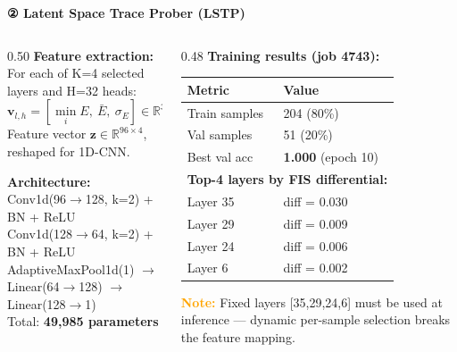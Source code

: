 \documentclass[aspectratio=169]{beamer}
\begin{document}
\begin{frame}{\textcolor{cmindsblue}{\textbf{② Latent Space Trace Prober (LSTP)}}}
  \vspace{-0.3cm}
  \begin{columns}[T]
    \begin{column}{0.50\textwidth}
      \textcolor{cmindsblue}{\textbf{Feature extraction:}}\\
      {\small For each of K=4 selected layers and H=32 heads:
      \[
        \mathbf{v}_{l,h} = [\min_i E,\ \bar{E},\ \sigma_E] \in \mathbb{R}^3
      \]
      Feature vector $\mathbf{z} \in \mathbb{R}^{96 \times 4}$, reshaped for 1D-CNN.
      }
      \vspace{3mm}

      \textcolor{cmindsblue}{\textbf{Architecture:}}\\
      {\scriptsize
      Conv1d(96$\to$128, k=2) + BN + ReLU\\
      Conv1d(128$\to$64, k=2) + BN + ReLU\\
      AdaptiveMaxPool1d(1) $\to$ Linear(64$\to$128) $\to$ Linear(128$\to$1)\\
      Total: \textbf{49,985 parameters}
      }
    \end{column}

    \begin{column}{0.48\textwidth}
      \textcolor{cmindsblue}{\textbf{Training results (job 4743):}}\\[4pt]
      {\scriptsize
      \begin{tabular}{ll}
        \toprule
        Metric & Value \\
        \midrule
        Train samples & 204 (80\%) \\
        Val samples   & 51  (20\%) \\
        Best val acc  & \textbf{1.000} (epoch 10) \\
        \midrule
        \multicolumn{2}{l}{\textbf{Top-4 layers by FIS differential:}} \\
        Layer 35 & diff = 0.030 \\
        Layer 29 & diff = 0.009 \\
        Layer 24 & diff = 0.006 \\
        Layer  6 & diff = 0.002 \\
        \bottomrule
      \end{tabular}
      }
      \vspace{3mm}
      {\scriptsize \textcolor{orange}{\textbf{Note:}} Fixed layers [35,29,24,6]
      must be used at inference — dynamic per-sample selection breaks
      the feature mapping.}


\end{column}
\end{columns}
\end{frame}
\end{document}
